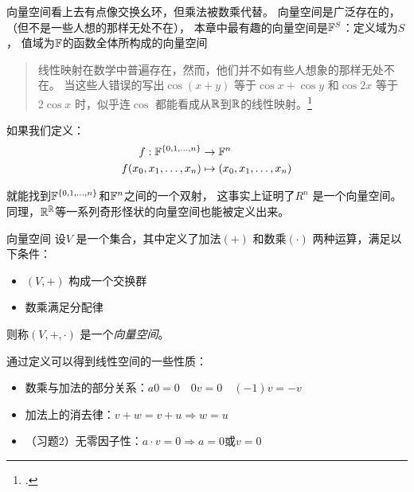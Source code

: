 向量空间看上去有点像交换幺环，但乘法被数乘代替。
向量空间是广泛存在的，（但不是一些人想的那样无处不在），
本章中最有趣的向量空间是\(\mathbb{F}^{S}\)：定义域为\(S\)，
值域为\(\mathbb{F}\)的函数全体所构成的向量空间
\begin{quote}
    线性映射在数学中普遍存在，然而，他们并不如有些人想象的那样无处不在。
    当这些人错误的写出\(\cos(x+y)\) 等于\(\cos x+\cos y\) 和\(\cos 2x\)
    等于 \(2\cos x\) 时，似乎连\(\cos\)
    都能看成从\(\mathbb{R}\)到\(\mathbb{R}\)的线性映射。\footcite[p.~46]{LADR}
\end{quote}
如果我们定义：
\[
    \begin{aligned}
        f: \mathbb{F}^{\{0,1,\dots,n\}} &\to \mathbb{F}^{n}\\
        f(x_{0}, x_{1}, \dots, x_{n}) &\mapsto (x_{0},
        x_{1}, \dots, x_{n})
    \end{aligned}
\]

就能找到\(\mathbb{F}^{\{0,1,\dots,n\}}\)和\(\mathbb{F}^{n}\)之间的一个双射，
这事实上证明了\(R^{n}\)
是一个向量空间。
同理，\(\mathbb{R}^{\mathbb{R}}\)等一系列奇形怪状的向量空间也能被定义出来。
\begin{definition}{向量空间}
    设\(V\) 是一个集合，其中定义了加法\((+)\) 和数乘\((\cdot)\) 两种运算，满足以下条件：
    \begin{itemize}
        \item \((V, +)\) 构成一个交换群
        \item 数乘满足分配律
    \end{itemize}
    则称\((V, +, \cdot)\) 是一个\emph{向量空间}。
\end{definition}

通过定义可以得到线性空间的一些性质：
\begin{itemize}
    \item 数乘与加法的部分关系：\(a0=0\quad 0v=0\quad (-1)v=-v\)
    \item 加法上的消去律：\(v+w=v+u \Rightarrow w=u \)
    \item （习题2）无零因子性：\(a\cdot v=0 \Rightarrow a=0
        \text{或} v=0\)
\end{itemize}

